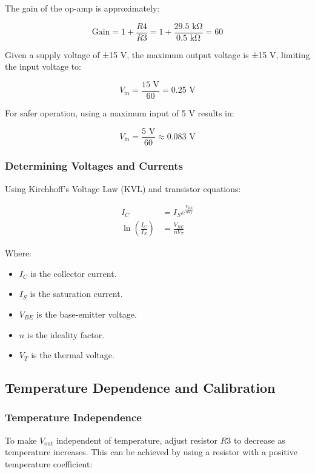 \documentclass[a4paper,9pt,twoside,openany,twocolumn]{memoir}
\begin{document}
The gain of the op-amp is approximately:

\[
\text{Gain} = 1 + \frac{R4}{R3} = 1 + \frac{29.5 \text{ kΩ}}{0.5 \text{ kΩ}} = 60
\]

Given a supply voltage of ±15 V, the maximum output voltage is ±15 V, limiting the input voltage to:

\[
V_{\text{in}} = \frac{15 \text{ V}}{60} = 0.25 \text{ V}
\]

For safer operation, using a maximum input of 5 V results in:

\[
V_{\text{in}} = \frac{5 \text{ V}}{60} \approx 0.083 \text{ V}
\]

\subsubsection{Determining Voltages and Currents}

Using Kirchhoff's Voltage Law (KVL) and transistor equations:

\begin{align}
    I_C &= I_S e^{\frac{V_{BE}}{n V_T}} \\
    \ln\left(\frac{I_C}{I_S}\right) &= \frac{V_{BE}}{n V_T}
\end{align}

Where:

\begin{itemize}
    \item \( I_C \) is the collector current.
    \item \( I_S \) is the saturation current.
    \item \( V_{BE} \) is the base-emitter voltage.
    \item \( n \) is the ideality factor.
    \item \( V_T \) is the thermal voltage.
\end{itemize}

\subsection{Temperature Dependence and Calibration}

\subsubsection{Temperature Independence}

To make \( V_{\text{out}} \) independent of temperature, adjust resistor \( R3 \) to decrease as temperature increases. This can be achieved by using a resistor with a positive temperature coefficient:
\end{document}
